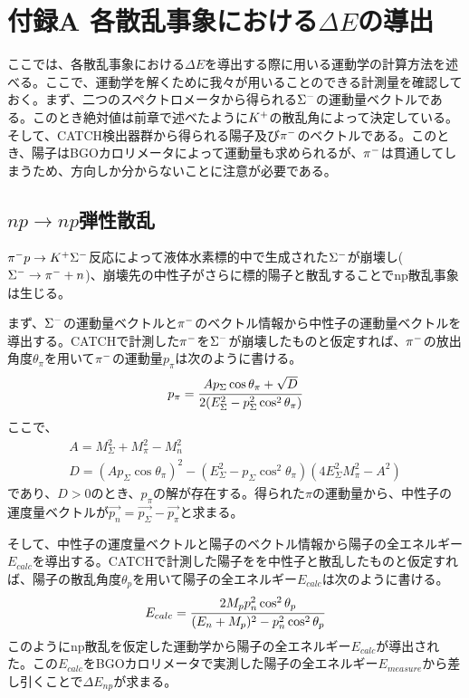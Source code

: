 
\def\thesection{A.\arabic{section}}
\chapter{{\bf 付録A 各散乱事象における$\Delta E$の導出}}
ここでは、各散乱事象における$\Delta E$を導出する際に用いる運動学の計算方法を述べる。ここで、運動学を解くために我々が用いることのできる計測量を確認しておく。まず、二つのスペクトロメータから得られる$\Sigma^{-}$の運動量ベクトルである。このとき絶対値は前章で述べたように$K^{+}$の散乱角によって決定している。そして、CATCH検出器群から得られる陽子及び$\pi^{-}$のベクトルである。このとき、陽子はBGOカロリメータによって運動量も求められるが、$\pi^{-}$は貫通してしまうため、方向しか分からないことに注意が必要である。
\section{$np\rightarrow np$弾性散乱}
$\pi^{-} p\rightarrow K^{+}\Sigma^{-}$反応によって液体水素標的中で生成された$\Sigma^{-}$が崩壊し($\Sigma^{-}\rightarrow\pi^{-} +n$)、崩壊先の中性子がさらに標的陽子と散乱することでnp散乱事象は生じる。\par
まず、$\Sigma^{-}$の運動量ベクトルと$\pi^{-}$のベクトル情報から中性子の運動量ベクトルを導出する。CATCHで計測した$\pi^{-}$を$\Sigma^{-}$が崩壊したものと仮定すれば、$\pi^{-}$の放出角度$\theta_{\pi}$を用いて$\pi^{-}$の運動量$p_{\pi}$は次のように書ける。
\begin{equation}
p_{\pi} = \cfrac{Ap_{\Sigma}\cos\theta_{\pi}+\sqrt{D}}{2(E^{2}_{\Sigma}-p^2_{\Sigma}\cos^{2}\theta_{\pi})}
\label{eq:decayPiMom}
\end{equation}
ここで、
\begin{gather}
\label{eq:decayPiMom1}
A = M^2_{\Sigma}+M^2_{\pi}-M^2_{n}\\
\label{eq:decayPiMom2}
D = (Ap_{\Sigma}\cos\theta_{\pi})^2-(E^{2}_{\Sigma}-p_{\Sigma}\cos^2\theta_{\pi})(4E^2_{\Sigma}M^2_{\pi}-A^2)
\end{gather}
であり、$D>0$のとき、$p_{\pi}$の解が存在する。得られた$\pi$の運動量から、中性子の運度量ベクトルが$\overrightarrow{p_{n}}=\overrightarrow{p_{\Sigma}}-\overrightarrow{p_{\pi}}$と求まる。\par
そして、中性子の運度量ベクトルと陽子のベクトル情報から陽子の全エネルギー$E_{calc}$を導出する。CATCHで計測した陽子をを中性子と散乱したものと仮定すれば、陽子の散乱角度$\theta_{p}$を用いて陽子の全エネルギー$E_{calc}$は次のように書ける。
\begin{equation}
E_{calc} = \cfrac{2M_{p}p^2_{n}\cos^2\theta_{p}}{(E_{n}+M_{p})^{2}-p^2_{n}\cos^2\theta_{p}}
\end{equation}
このようにnp散乱を仮定した運動学から陽子の全エネルギー$E_{calc}$が導出された。この$E_{calc}$をBGOカロリメータで実測した陽子の全エネルギー$E_{measure}$から差し引くことで$\Delta E_{np}$が求まる。
